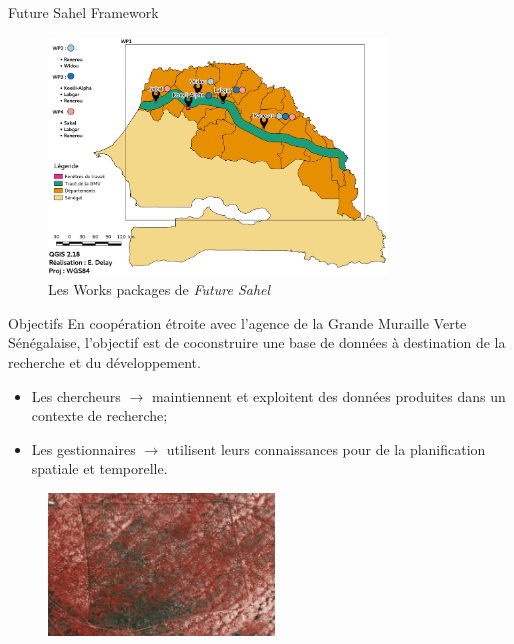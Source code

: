 \documentclass[newPxFont]{beamer}
\begin{document}
\begin{frame}[c]{Future Sahel Framework}
\vspace{-1cm}
\begin{figure}
	\centering
	\includegraphics[width = 0.8\textwidth]{img/Carte_FutureSahel}
	\caption{Les Works packages de \textit{Future Sahel}}
\end{figure}
\end{frame}


\begin{frame}[c]{Objectifs}
\vspace{-1cm}
En coopération étroite avec l'agence de la Grande Muraille Verte Sénégalaise, l'objectif est de coconstruire une base de données à destination de la recherche et du développement.
	\begin{itemize}
		\item Les chercheurs $\rightarrow$ maintiennent et exploitent des données produites dans un contexte de recherche;
		\item Les gestionnaires $\rightarrow$ utilisent leurs connaissances pour de la planification spatiale et temporelle.
	\end{itemize}
  \begin{figure}
  	\centering
  	\includegraphics[width = 6cm]{img/IR_spot}
  \end{figure}
\end{frame}
\end{document}
